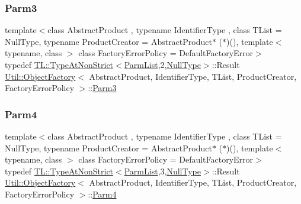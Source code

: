 \subsubsection{\texorpdfstring{Parm3}{Parm3}\hspace{0.1cm}{\footnotesize\ttfamily [3/3]}}
{\footnotesize\ttfamily template$<$class Abstract\+Product , typename Identifier\+Type , class T\+List  = Null\+Type, typename Product\+Creator  = Abstract\+Product$\ast$ ($\ast$)(), template$<$ typename, class $>$ class Factory\+Error\+Policy = Default\+Factory\+Error$>$ \\
typedef \mbox{\hyperlink{structUtil_1_1TL_1_1TypeAtNonStrict}{T\+L\+::\+Type\+At\+Non\+Strict}}$<$\mbox{\hyperlink{classUtil_1_1ObjectFactory_a46f003a5928e8a60140e0a74ac261c36}{Parm\+List}},2,\mbox{\hyperlink{classUtil_1_1NullType}{Null\+Type}}$>$\+::Result \mbox{\hyperlink{classUtil_1_1ObjectFactory}{Util\+::\+Object\+Factory}}$<$ Abstract\+Product, Identifier\+Type, T\+List, Product\+Creator, Factory\+Error\+Policy $>$\+::\mbox{\hyperlink{classUtil_1_1ObjectFactory_ae5c679dd2f210e0a5ad257b336f754fb}{Parm3}}}

\mbox{\label{classUtil_1_1ObjectFactory_a052f09d9e81b11d98bb53a52f327cf01}} 
\subsubsection{\texorpdfstring{Parm4}{Parm4}\hspace{0.1cm}{\footnotesize\ttfamily [1/3]}}
{\footnotesize\ttfamily template$<$class Abstract\+Product , typename Identifier\+Type , class T\+List  = Null\+Type, typename Product\+Creator  = Abstract\+Product$\ast$ ($\ast$)(), template$<$ typename, class $>$ class Factory\+Error\+Policy = Default\+Factory\+Error$>$ \\
typedef \mbox{\hyperlink{structUtil_1_1TL_1_1TypeAtNonStrict}{T\+L\+::\+Type\+At\+Non\+Strict}}$<$\mbox{\hyperlink{classUtil_1_1ObjectFactory_a46f003a5928e8a60140e0a74ac261c36}{Parm\+List}},3,\mbox{\hyperlink{classUtil_1_1NullType}{Null\+Type}}$>$\+::Result \mbox{\hyperlink{classUtil_1_1ObjectFactory}{Util\+::\+Object\+Factory}}$<$ Abstract\+Product, Identifier\+Type, T\+List, Product\+Creator, Factory\+Error\+Policy $>$\+::\mbox{\hyperlink{classUtil_1_1ObjectFactory_a052f09d9e81b11d98bb53a52f327cf01}{Parm4}}}

